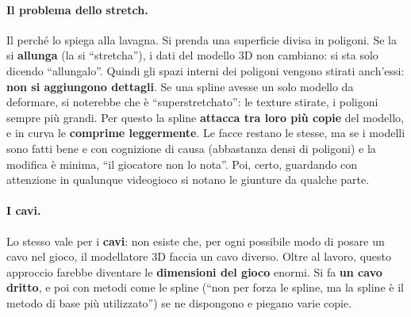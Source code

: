 \paragraph{Il problema dello stretch.} Il perché lo spiega alla lavagna. Si
prenda una superficie divisa in poligoni. Se la si \textbf{allunga} (la si
``stretcha''), i dati del modello 3D non cambiano: si sta solo dicendo
``allungalo''. Quindi gli spazi interni dei poligoni vengono stirati anch'essi:
\textbf{non si aggiungono dettagli}. Se una spline avesse un solo modello da
deformare, si noterebbe che è ``superstretchato'': le texture stirate, i
poligoni sempre più grandi. Per questo la spline \textbf{attacca tra loro più
copie} del modello, e in curva le \textbf{comprime leggermente}. Le facce
restano le stesse, ma se i modelli sono fatti bene e con cognizione di causa
(abbastanza densi di poligoni) e la modifica è minima, ``il giocatore non lo
nota''. Poi, certo, guardando con attenzione in qualunque videogioco si notano
le giunture da qualche parte.

\paragraph{I cavi.} Lo stesso vale per i \textbf{cavi}: non esiste che, per ogni
possibile modo di posare un cavo nel gioco, il modellatore 3D faccia un cavo
diverso. Oltre al lavoro, questo approccio farebbe diventare le
\textbf{dimensioni del gioco} enormi. Si fa \textbf{un cavo dritto}, e poi con
metodi come le spline (``non per forza le spline, ma la spline è il metodo di
base più utilizzato'') se ne dispongono e piegano varie copie.


